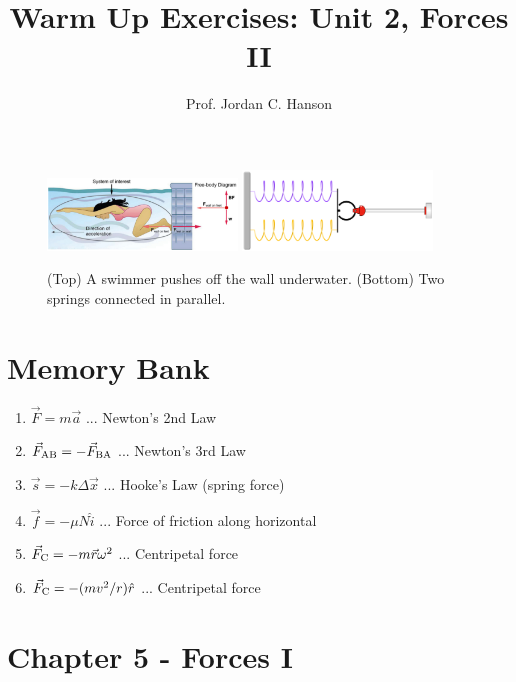 \documentclass{article}
\begin{document}
\twocolumn

\title{Warm Up Exercises: Unit 2, Forces II}
\author{Prof. Jordan C. Hanson}

\maketitle

\begin{figure}[ht]
\centering
\includegraphics[width=0.45\textwidth]{figures/wall.png}
\includegraphics[width=0.45\textwidth]{figures/parallel_springs.png}
\caption{\label{fig:1} (Top) A swimmer pushes off the wall underwater. (Bottom) Two springs connected in parallel.}
\end{figure}

\section{Memory Bank}

\begin{enumerate}
\item $\vec{F} = m \vec{a}$ ... Newton's 2nd Law
\item $\vec{F}_{\rm AB} = -\vec{F}_{\rm BA}$ ... Newton's 3rd Law
\item $\vec{s} = -k \Delta \vec{x}$ ... Hooke's Law (spring force)
\item $\vec{f} = -\mu N \hat{i}$ ... Force of friction along horizontal
\item $\vec{F}_{\rm C} = - m \vec{r} \omega^2$ ... Centripetal force
\item $\vec{F}_{\rm C} = -(mv^2/r)\hat{r}$ ... Centripetal force
\end{enumerate}

\section{Chapter 5 - Forces I}
\end{document}
